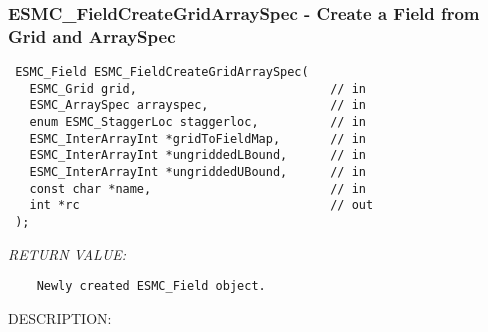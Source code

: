 
\setlength{\oldparskip}{\parskip}
\setlength{\parskip}{1.5ex}
\setlength{\oldparindent}{\parindent}
\setlength{\parindent}{0pt}
\setlength{\oldbaselineskip}{\baselineskip}
\setlength{\baselineskip}{11pt}
 
\def\bv{\begin{verbatim}}
\def\ev{\end{verbatim}}
\def\be{\begin{equation}}
\def\ee{\end{equation}}
\def\bea{\begin{eqnarray}}
\def\eea{\end{eqnarray}}
\def\bi{\begin{itemize}}
\def\ei{\end{itemize}}
\def\bn{\begin{enumerate}}
\def\en{\end{enumerate}}
\def\bd{\begin{description}}
\def\ed{\end{description}}
\def\({\left (}
\def\){\right )}
\def\[{\left [}
\def\]{\right ]}
\def\<{\left  \langle}
\def\>{\right \rangle}
\def\cI{{\cal I}}
\def\diag{\mathop{\rm diag}}
\def\tr{\mathop{\rm tr}}


 
\subsubsection [ESMC\_FieldCreateGridArraySpec] {ESMC\_FieldCreateGridArraySpec - Create a Field from Grid and ArraySpec}


  
\begin{verbatim} ESMC_Field ESMC_FieldCreateGridArraySpec(
   ESMC_Grid grid,                           // in
   ESMC_ArraySpec arrayspec,                 // in
   enum ESMC_StaggerLoc staggerloc,          // in
   ESMC_InterArrayInt *gridToFieldMap,       // in
   ESMC_InterArrayInt *ungriddedLBound,      // in
   ESMC_InterArrayInt *ungriddedUBound,      // in
   const char *name,                         // in
   int *rc                                   // out
 );
 \end{verbatim}{\em RETURN VALUE:}
\begin{verbatim}    Newly created ESMC_Field object.\end{verbatim}
{\sf DESCRIPTION:\\ }



